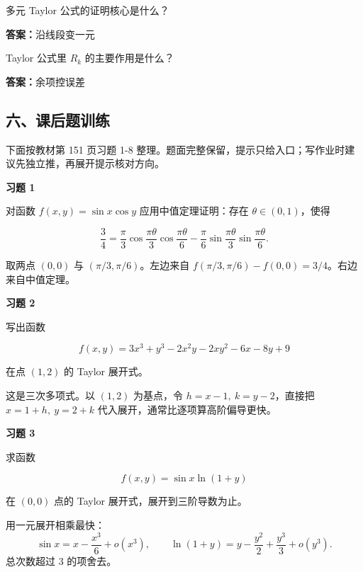 \begin{quickcheck}
多元 Taylor 公式的证明核心是什么？

\tcblower
\textbf{答案：}沿线段变一元
\end{quickcheck}

\begin{quickcheck}
Taylor 公式里 \(R_k\) 的主要作用是什么？

\tcblower
\textbf{答案：}余项控误差
\end{quickcheck}

\subsection*{六、课后题训练}

下面按教材第 151 页习题 1-8 整理。题面完整保留，提示只给入口；写作业时建议先独立推，再展开提示核对方向。

\begin{exercisebox}
\textbf{习题 1}

对函数 \(f(x,y)=\sin x\cos y\) 应用中值定理证明：存在 \(\theta\in(0,1)\)，使得

\[
        \frac34
        =
        \frac{\pi}{3}\cos\frac{\pi\theta}{3}\cos\frac{\pi\theta}{6}
        -
        \frac{\pi}{6}\sin\frac{\pi\theta}{3}\sin\frac{\pi\theta}{6}.
      \]

\begin{hintbox}
取两点 \((0,0)\) 与 \((\pi/3,\pi/6)\)。左边来自 \(f(\pi/3,\pi/6)-f(0,0)=3/4\)。右边来自中值定理。
\end{hintbox}
\end{exercisebox}

\begin{exercisebox}
\textbf{习题 2}

写出函数

\[
        f(x,y)=3x^3+y^3-2x^2y-2xy^2-6x-8y+9
      \]

在点 \((1,2)\) 的 Taylor 展开式。

\begin{hintbox}
这是三次多项式。以 \((1,2)\) 为基点，令 \(h=x-1,\ k=y-2\)，直接把 \(x=1+h,\ y=2+k\) 代入展开，通常比逐项算高阶偏导更快。
\end{hintbox}
\end{exercisebox}

\begin{exercisebox}
\textbf{习题 3}

求函数

\[
        f(x,y)=\sin x\ln(1+y)
      \]

在 \((0,0)\) 点的 Taylor 展开式，展开到三阶导数为止。

\begin{hintbox}
用一元展开相乘最快： \[
          \sin x=x-\frac{x^3}{6}+o(x^3),\qquad
          \ln(1+y)=y-\frac{y^2}{2}+\frac{y^3}{3}+o(y^3).
        \] 总次数超过 3 的项舍去。
\end{hintbox}
\end{exercisebox}

